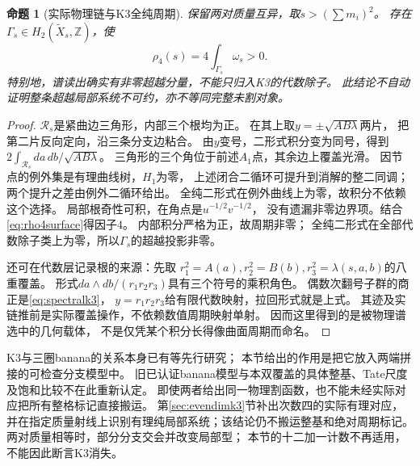 \documentclass[11pt,a4paper]{ctexart}
\theoremstyle{cnplain}\newtheorem{theorem}{定理}[section]
\newtheorem{proposition}[theorem]{命题}
\theoremstyle{definition}\newtheorem{definition}[theorem]{定义}
\theoremstyle{remark}\newtheorem{remark}[theorem]{注}
\begin{document}
\begin{proposition}[实际物理链与K3全纯周期]\label{prop:k3spectralchain}
保留两对质量互异，取$s>(\sum m_i)^2$。
存在$\Gamma_s\in H_2(\widetilde X_s,\mathbb Z)$，使
\begin{equation}\label{eq:k3spectralperiod}
                 \rho_4(s)=4\int_{\Gamma_s}\omega_s>0.
\end{equation}
特别地，谱读出确实有非零超越分量，不能只归入K3的代数除子。
此结论不自动证明整条超越局部系统不可约，亦不等同完整未割对象。
\end{proposition}
\begin{proof}
$\mathcal R_s$是紧曲边三角形，内部三个根均为正。
在其上取$y=\pm\sqrt{AB\lambda}$两片，
把第二片反向定向，沿三条分支边粘合。
由$y$变号，二形式积分变为同号，得到
$2\int_{\mathcal R_s}da\,db/\sqrt{AB\lambda}$。
三角形的三个角位于前述$A_1$点，其余边上覆盖光滑。
因节点的例外集是有理曲线树，$H_1$为零，
上述闭合二循环可提升到消解的整二同调；
两个提升之差由例外二循环给出。
全纯二形式在例外曲线上为零，故积分不依赖这个选择。
局部根奇性可积，在角点是$u^{-1/2}v^{-1/2}$，
没有遗漏非零边界项。结合\eqref{eq:rho4surface}得因子$4$。
内部积分严格为正，故周期非零；
全纯二形式在全部代数除子类上为零，所以$\Gamma_s$的超越投影非零。

还可在代数层记录根的来源：先取
$r_1^2=A(a),r_2^2=B(b),r_3^2=\lambda(s,a,b)$的八重覆盖。
形式$da\wedge db/(r_1r_2r_3)$具有三个符号的乘积角色。
偶数次翻号子群的商正是\eqref{eq:spectralk3}，
$y=r_1r_2r_3$给有限代数映射，拉回形式就是上式。
其迹及实链推前是实际覆盖操作，不依赖数值周期映射单射。
因而这里得到的是被物理谱选中的几何载体，
不是仅凭某个积分长得像曲面周期而命名。
\end{proof}

K3与三圈banana的关系本身已有\cite{BKV}等先行研究；
本节给出的作用是把它放入两端拼接的可检查分支模型中。
旧已认证banana模型与本双覆盖的具体整基、Tate尺度及饱和比较不在此重新认定。
即使两者给出同一物理割函数，也不能未经实际对应把所有整格标记直接搬运。
第\ref{sec:evendimk3}节补出次数四的实际有理对应，
并在指定质量射线上识别有理纯局部系统；该结论仍不搬运整基和绝对周期标记。
两对质量相等时，部分分支交会并改变局部型；
本节的十二加一计数不再适用，不能因此断言K3消失。
\end{document}

